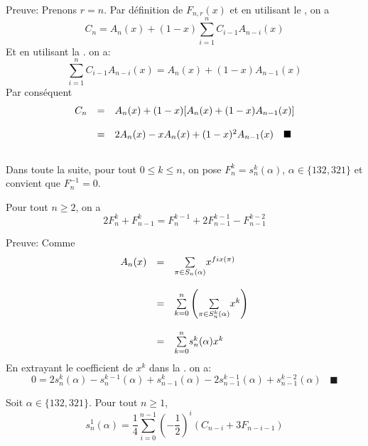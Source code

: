 Preuve:
Prenons $r = n$. Par définition de $F_{n, r}(x)$ et en utilisant le , on a
\[C_{n}=A_{n}(x)+(1-x)\underset{i=1}{\overset{n}{\sum}}C_{i-1}A_{n-i}(x) \]
Et en utilisant la . on a:
\[\underset{i=1}{\overset{n}{\sum}}C_{i-1}A_{n-i}(x) =A_{n}(x)+(1-x)A_{n-1}(x)\]
Par conséquent
\[
	\begin{array}{l l l}
		C_{n} & =       & A_{n}(x)+(1-x)[A_{n}(x)+(1-x)A_{n-1}(x)]                                       \\
		      & \text{} &                                                                                \\
		      & =       & 2A_{n}(x)-xA_{n}(x)+(1-x)^{2}A_{n-1}(x)\hspace{10pt}\blacksquare\vspace{ 15pt}
	\end{array}
\]
Dans toute la suite, pour tout $0\leq k\leq n$, on pose $F_{n}^{k}=s_{n}^{k}(\alpha)$, $\alpha\in\{132,321\}$ et convient que $F_{n}^{-1}=0$.
\begin{proposition} \label{genFn} Pour tout $n\geq 2$, on a
	\[
		2F_{n}^{k}+F_{n-1}^{k}=F_{n}^{k-1}+2F_{n-1}^{k-1}-F_{n-1}^{k-2}
	\]
\end{proposition}
Preuve:
Comme
\[
	\begin{array}{l l  l}

		A_{n}(x) & =       & \underset{\pi\in S_{n}(\alpha)}{\sum}x^{fix(\pi)}                                            \\
		         & \text{} &                                                                                              \\
		         & =       & \underset{k=0}{\overset{n}{\sum}}\left(\underset{\pi\in S_{n}^{k}(\alpha)}{\sum}x^{k}\right) \\
		         & \text{} &                                                                                              \\
		         & =       & \underset{k=0}{\overset{n}{\sum}}s_{n}^{k}(\alpha)x^{k}
	\end{array}
\]
En extrayant le coefficient de $x^{k}$ dans la . on a:
\[ 0=2s_{n}^{k}(\alpha)-s_{n}^{k-1}(\alpha)+s_{n-1}^{k}(\alpha)-2s_{n-1}^{k-1}(\alpha)+s_{n-1}^{k-2}(\alpha)\hspace{10pt}\blacksquare \]

\begin{proposition}
	Soit $\alpha\in \{132,321\}$. Pour tout
	$ n\geq 1$, \[s_{n}^{1}(\alpha)=\frac{1}{4}\underset{i=0}{\overset{n-1}{\sum}}(-\frac{1}{2})^{i}\left(C_{n-i}+3F_{n-i-1}\right) \]
\end{proposition}

